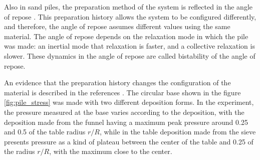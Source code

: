 
    Also in sand piles, the preparation method of the system is reflected in the angle of repose \cite{Dynamics_at_the_angle_of_repose}. This preparation history allows the system to be configured differently, and therefore, the angle of repose assumes different values using the same material. The angle of repose depends on the relaxation mode in which the pile was made: an inertial mode that relaxation is faster, and a collective relaxation is slower. These dynamics in the angle of repose are called bistability of the angle of repose.


    An evidence that the preparation history changes the configuration of the material is described in the references \cite{Memories_in_Sand, Sensitivity_of_Stress_Response_Function_to_Packing_Preparation}. The circular base shown in the figure \ref{fig:pile_stress} was made with two different deposition forms. In the experiment, the pressure measured at the base varies according to the deposition, with the deposition made from the funnel having a maximum peak pressure around 0.25 and 0.5 of the table radius $r/R$, while in the table deposition made from the sieve presents pressure as a kind of plateau between the center of the table and 0.25 of the radius $r/R$, with the maximum close to the center.

